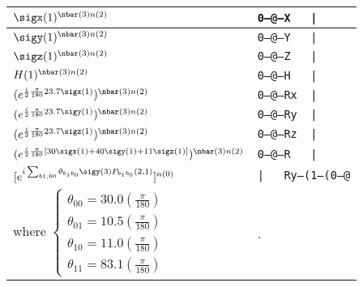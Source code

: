 \documentclass[10pt]{article}
\begin{document}
\begin{tabular}{|l|l|}
 $\sigx(1)^{\nbar(3)n(2)}$& {\tt 0---@---X\ \ \ |} \\
\hline
 $\sigy(1)^{\nbar(3)n(2)}$& {\tt 0---@---Y\ \ \ |} \\
\hline
 $\sigz(1)^{\nbar(3)n(2)}$& {\tt 0---@---Z\ \ \ |} \\
\hline
$H(1)^{\nbar(3)n(2)}$& {\tt 0---@---H\ \ \ |} \\
\hline
$(e^{\frac{i}{2} \frac{\pi}{180} 23.7 \sigx(1)})^{\nbar(3)n(2)}$&
{\tt 0---@---Rx\ \ |} \\
\hline
$(e^{\frac{i}{2}  \frac{\pi}{180} 23.7 \sigy(1)})^{\nbar(3)n(2)}$&
{\tt 0---@---Ry\ \ |} \\
\hline
$(e^{\frac{i}{2}  \frac{\pi}{180} 23.7 \sigz(1)})^{\nbar(3)n(2)}$&
{\tt 0---@---Rz\ \ |} \\
\hline
$(e^{
\frac{i}{2}  \frac{\pi}{180}
[30\sigx(1)+ 40\sigy(1) + 11 \sigz(1)]
})^{\nbar(3)n(2)}$&
{\tt 0---@---R\ \ \ |} \\
\hline
$[e^{i\sum_{b1,b0}\theta_{b_1b_0}\sigy(3)P_{b_1b_0}(2,1)}]^{n(0)}$
&
{\tt |\ \ \ Ry--(1--(0--@}
\\
where $\left\{\begin{array}{l}
\theta_{00}=30.0(\frac{\pi}{180})
\\
\theta_{01}=10.5(\frac{\pi}{180})
\\
\theta_{10}=11.0(\frac{\pi}{180})
\\
\theta_{11}=83.1(\frac{\pi}{180})
\end{array}\right.$
& .
\\
\hline
\end{tabular}
\end{document}
